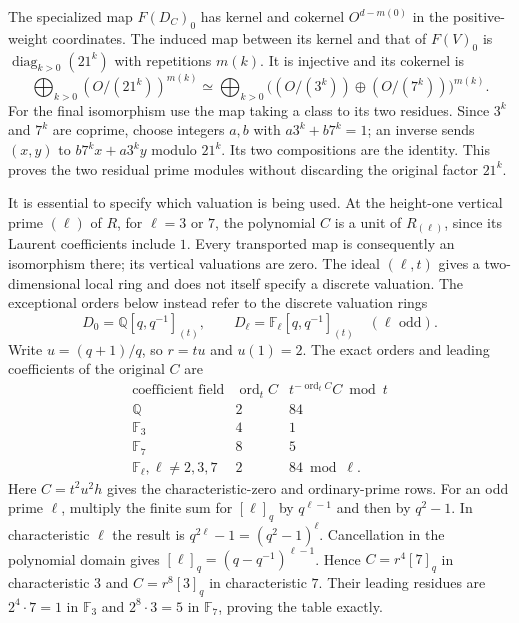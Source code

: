 The specialized map $F(D_C)_0$ has kernel and cokernel
$O^{d-m(0)}$ in the positive-weight coordinates. The induced map
between its kernel and that of $F(V)_0$ is
$\operatorname{diag}_{k>0}(21^k)$ with repetitions $m(k)$.
It is injective and its cokernel is
\[
 \bigoplus_{k>0}(O/(21^k))^{m(k)}
 \simeq\bigoplus_{k>0}
       \big((O/(3^k))\oplus(O/(7^k))\big)^{m(k)}.
\]
For the final isomorphism use the map taking a class to its two
residues. Since $3^k$ and $7^k$ are coprime, choose integers $a,b$
with $a3^k+b7^k=1$; an inverse sends $(x,y)$ to
$b7^kx+a3^ky$ modulo $21^k$. Its two compositions are the identity.
This proves the two residual prime modules without discarding the
original factor $21^k$.

It is essential to specify which valuation is being used.
At the height-one vertical prime $(\ell)$ of $R$, for $\ell=3$ or
$7$, the polynomial $C$ is a unit of $R_{(\ell)}$, since its Laurent
coefficients include $1$. Every transported map is consequently an
isomorphism there; its vertical valuations are zero. The ideal
$(\ell,t)$ gives a two-dimensional local ring and does not itself
specify a discrete valuation. The exceptional orders below instead
refer to the discrete valuation rings
\[
 D_0=\mathbb Q[q,q^{-1}]_{(t)},\qquad
 D_\ell=\mathbb F_\ell[q,q^{-1}]_{(t)}\quad(\ell\text{ odd}).
\]
Write $u=(q+1)/q$, so $r=tu$ and $u(1)=2$. The exact orders and
leading coefficients of the original $C$ are
\[
\begin{array}{c|c|c}
\text{coefficient field}&\operatorname{ord}_t C&
          t^{-\operatorname{ord}_tC}C\bmod t\\\hline
\mathbb Q&2&84\\
\mathbb F_3&4&1\\
\mathbb F_7&8&5\\
\mathbb F_\ell, \ell\ne2,3,7&2&84\bmod\ell.
\end{array}
\]
Here $C=t^2u^2h$ gives the characteristic-zero and ordinary-prime
rows. For an odd prime $\ell$, multiply the finite sum for
$[\ell]_q$ by $q^{\ell-1}$ and then by $q^2-1$. In characteristic
$\ell$ the result is $q^{2\ell}-1=(q^2-1)^\ell$.
Cancellation in the polynomial domain gives
$[\ell]_q=(q-q^{-1})^{\ell-1}$. Hence $C=r^4[7]_q$ in
characteristic $3$ and $C=r^8[3]_q$ in characteristic $7$.
Their leading residues are $2^4\cdot7=1$ in $\mathbb F_3$ and
$2^8\cdot3=5$ in $\mathbb F_7$, proving the table exactly.

